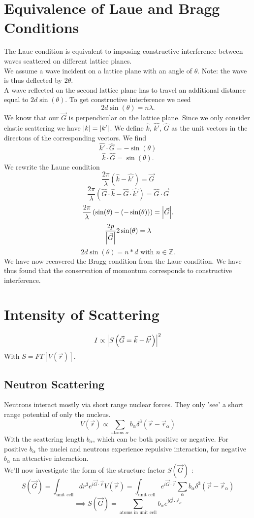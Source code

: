 \documentclass{report}
\begin{document}
\section{Equivalence of Laue and Bragg Conditions}
The Laue condition is equivalent to imposing constructive interference between waves scattered on different lattice planes. \\
We assume a wave incident on a lattice plane with an angle of $\theta$. Note: the wave is thus deflected by $2\theta$.\\
A wave reflected on the second lattice plane has to travel an additional distance equal to $2 d \sin\left( \theta \right) $. To get constructive interference we need \[
	2 d \sin\left( \theta \right) = n \lambda
.\] 
We know that our $\vec{G}$ is perpendicular on the lattice plane. Since we only consider elastic scattering we have $\abs{k} = \abs{k'}$. We define $\hat{k}$, $\hat{k'}$, $\hat{G}$ as the unit vectors in the directons of the corresponding vectors. We find \[
	\hat{k'} \cdot \hat{G} = -\sin\left( \theta \right) 
\] \[
\hat{k} \cdot \hat{G} = \sin\left( \theta \right) 
.\] We rewrite the Laune condition \[
\frac{2\pi}{\lambda} \left( \hat{k} -  \hat{k'} \right) = \vec{G}
\] \[
\frac{2\pi}{\lambda} \left( \hat{G}\cdot \hat{k} - \hat{G}\cdot \hat{k'} \right) = \hat{G} \cdot \vec{G}
\]\[
\frac{2\pi}{\lambda} \left( \sin(\theta) - \left( -\sin(\theta) \right)  \right) = \abs{\vec{G}}
.\]  \[
\frac{2p}{\abs{\vec{G}}} 2 \sin(\theta) = \lambda
\] \[
2d\sin(\theta) = n*d \text{  with } n \in \mathbb{Z} 
.\]  We have now recavered the Bragg condition from the Laue condition. We have thus found that the conservation of momontum corresponds to constructive interference.\\
\section{Intensity of Scattering}
\[
	I \propto \abs{S\left( \vec{G} = \vec{k} - \vec{k'} \right) }^2
\] With $S = FT[V(\vec{r})]$. \\
\subsection{Neutron Scattering}
Neutrons interact mostly via short range nuclear forces. They only 'see' a short range potential of only the nucleus. \[
	V(\vec{r}) \propto \sum_{\text{atoms }\alpha} b_{\alpha} \delta^3(\vec{r} - \vec{r}_{\alpha})
\] With the scattering length $b_{\alpha}$, which can be both positive or negative. For positive $b_{\alpha}$ the nuclei and neutrons experience repulsive interaction, for negative $b_{\alpha}$ an attcactive interaction.\\
We'll now investigate the form of the structure factor $S(\vec{G})$ : \[
	S(\vec{G}) = \int_{\text{unit cell}} dr^3 e^{i \vec{G}\cdot\vec{r}} V(\vec{r}) = \int_{\text{unit cell}} e^{i \vec{G} \cdot \vec{r}} \sum_{\alpha} b_{\alpha} \delta^3\left( \vec{r} - \vec{r}_{\alpha} \right) 
\] \[
\implies S(\vec{G}) = \sum_{\text{atoms in unit cell}} b_{\alpha} e^{i \vec{G} \cdot \vec{r}_{\alpha}}
\]
\end{document}
